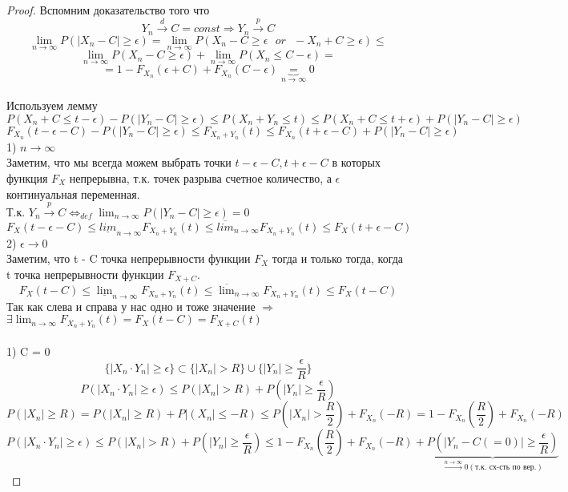 	\begin{proof}
		Вспомним доказательство того что
		$$Y_n\xrightarrow{d}C = const \Rightarrow Y_n\xrightarrow{p}C$$
		$$\lim_{n\to\infty}P(|X_n - C| \geqslant \epsilon) = \lim_{n\to\infty}P(X_n - C \geqslant \epsilon\text{ }or\text{ } -X_n + C \geqslant \epsilon)\leqslant$$
		$$ \lim_{n\to\infty}P(X_n - C\geqslant \epsilon) + \lim_{n\to\infty}P(X_n \leqslant C - \epsilon) =$$ 
		$$= 1 - F_{X_n}(\epsilon + C) + F_{X_n}(C - \epsilon) \underbrace{=}_{n\to\infty} 0$$
		\text{ }\\
		Используем лемму
		$$ P(X_n + C \leqslant t - \epsilon)- P(|Y_n - C|\geqslant\epsilon)\leqslant P(X_n + Y_n\leqslant t) \leqslant P(X_n + C\leqslant t + \epsilon) + P(|Y_n - C|\geqslant\epsilon) $$
		$$ F_{X_n}(t - \epsilon - C)- P(|Y_n - C|\geqslant\epsilon)\leqslant F_{X_n + Y_n}(t) \leqslant F_{X_n} (t + \epsilon - C)+ P(|Y_n - C|\geqslant\epsilon) $$
		1) $ n\to\infty $\\
		Заметим, что мы всегда можем выбрать точки $ t - \epsilon - C, t + \epsilon - C $ в которых функция $ F_X $ непрерывна, т.к. точек разрыва счетное количество, а $ \epsilon $ континуальная переменная.\\
		Т.к. $ Y_n\xrightarrow{p}C \Leftrightarrow_{def} \lim_{n\to\infty}P(|Y_n - C|\geqslant\epsilon) = 0 $
		$$ F_{X}(t - \epsilon - C)\leqslant \underline{lim}_{n\to\infty}F_{X_n + Y_n}(t)\leqslant \overline{lim}_{n\to\infty}F_{X_n + Y_n}(t) \leqslant F_{X} (t + \epsilon - C)$$
		2) $ \epsilon \to 0 $\\
		Заметим, что t - C точка непрерывности функции $ F_X $ тогда и только тогда, когда t точка непрерывности функции $ F_{X + C}  $.
		$$ F_{X}(t - C)\leqslant \underline{\lim}_{n\to\infty}F_{X_n + Y_n}(t)\leqslant \overline{\lim}_{n\to\infty}F_{X_n + Y_n}(t) \leqslant F_{X} (t  - C)$$
		Так как слева и справа у нас одно и тоже значение $ \Rightarrow $
		$\exists \lim_{n\to\infty}F_{X_n + Y_n}(t) = F_{X} (t  - C) = F_{X + C} (t)$
		\text{ }\\
		\text{ }\\
		1) C = 0\\
		$$ \{|X_n\cdot Y_n| \geqslant \epsilon\} \subset \{|X_n| > R\}\cup \{|Y_n| \geqslant \frac{\epsilon}{R}\}$$
		$$ P(|X_n\cdot Y_n| \geqslant \epsilon ) \leqslant P(|X_n| > R) + P(|Y_n| \geqslant \frac{\epsilon}{R}) $$
		$$ P(|X_n| \geqslant R) = P(|X_n| \geqslant R) + P|(X_n| \leqslant -R) \leqslant P(|X_n| > \frac{R}{2}) + F_{X_n}(-R) = 1 - F_{X_n}(\frac{R}{2}) + F_{X_n}(-R)$$
		$$ P(|X_n\cdot Y_n| \geqslant \epsilon ) \leqslant P(|X_n| > R) + P(|Y_n| \geqslant \frac{\epsilon}{R}) \leqslant 1 - F_{X_n}(\frac{R}{2}) + F_{X_n}(-R) + \underbrace{P(|Y_n - C(=0)| \geqslant \frac{\epsilon}{R})}_{\xrightarrow{n\to\infty} 0(\text{т.к. сх-сть по вер.})}$$

\end{proof}
